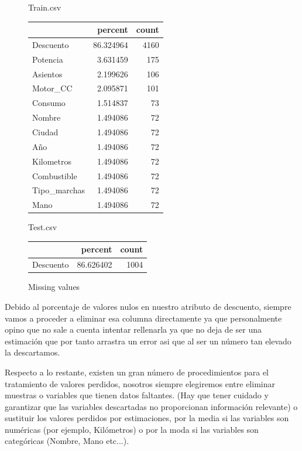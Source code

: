 \documentclass[12pt,twoside]{report}
\begin{document}
\begin{figure}[H]
Train.csv
\begin{multicols}{2}
\begin{tabular}{lrr}
\toprule{} &    percent &  count \\
\midrule Descuento    &  86.324964 &   4160 \\
Potencia     &   3.631459 &    175 \\
Asientos     &   2.199626 &    106 \\
Motor\_CC     &   2.095871 &    101 \\
Consumo      &   1.514837 &     73 \\
Nombre       &   1.494086 &     72 \\
Ciudad       &   1.494086 &     72 \\
Año          &   1.494086 &     72 \\
Kilometros   &   1.494086 &     72 \\
Combustible  &   1.494086 &     72 \\
Tipo\_marchas &   1.494086 &     72 \\
Mano         &   1.494086 &     72 \\
\bottomrule
\end{tabular}



\columnbreak

Test.csv


\begin{tabular}{lrr}
\toprule{} &    percent &  count \\
\midrule Descuento &  86.626402 &   1004 \\
\bottomrule
\end{tabular}
\end{multicols}
\caption{Missing values}
\end{figure}

Debido al porcentaje de valores nulos en nuestro atributo de descuento, siempre vamos a proceder a eliminar esa columna directamente ya que personalmente opino que no sale a cuenta intentar rellenarla  ya que no deja de ser una estimación que por tanto arrastra un error asi que al ser un número tan elevado la descartamos.

Respecto a lo restante, existen un gran número de procedimientos para el tratamiento de valores perdidos, nosotros siempre elegiremos entre eliminar muestras o variables que tienen datos faltantes. (Hay que tener cuidado y garantizar que las variables descartadas no proporcionan información relevante) o sustituir los valores perdidos por estimaciones, por la media si las variables son numéricas (por ejemplo, Kilómetros) o por la moda si las variables son categóricas (Nombre, Mano etc...). 
\end{document}
